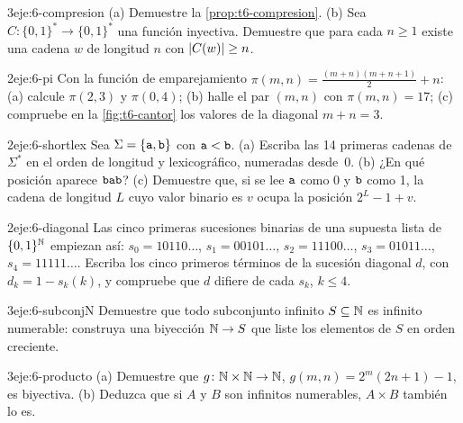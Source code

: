 \begin{ejercicio}{3}{eje:6-compresion}
(a) Demuestre la \cref{prop:t6-compresion}. (b) Sea $C\colon\{0,1\}^{*}\to\{0,1\}^{*}$ una función inyectiva. Demuestre que para cada $n\ge1$ existe una cadena $w$ de longitud $n$ con $\lvert C(w)\rvert\ge n$.
\end{ejercicio}

\begin{ejercicio}{2}{eje:6-pi}
Con la función de emparejamiento $\pi(m,n)=\tfrac{(m+n)(m+n+1)}{2}+n$: (a) calcule $\pi(2,3)$ y $\pi(0,4)$; (b) halle el par $(m,n)$ con $\pi(m,n)=17$; (c) compruebe en la \cref{fig:t6-cantor} los valores de la diagonal $m+n=3$.
\end{ejercicio}

\begin{ejercicio}{2}{eje:6-shortlex}
Sea $\Sigma=\{\texttt{a},\texttt{b}\}$ con $\texttt{a}<\texttt{b}$. (a) Escriba las 14 primeras cadenas de $\Sigma^{*}$ en el orden de longitud y lexicográfico, numeradas desde~0. (b) ¿En qué posición aparece $\texttt{bab}$? (c) Demuestre que, si se lee $\texttt{a}$ como 0 y $\texttt{b}$ como 1, la cadena de longitud $L$ cuyo valor binario es $v$ ocupa la posición $2^{L}-1+v$.
\end{ejercicio}

\begin{ejercicio}{2}{eje:6-diagonal}
Las cinco primeras sucesiones binarias de una supuesta lista de $\{0,1\}^{\mathbb{N}}$ empiezan así: $s_0=10110\ldots$, $s_1=00101\ldots$, $s_2=11100\ldots$, $s_3=01011\ldots$, $s_4=11111\ldots$. Escriba los cinco primeros términos de la sucesión diagonal $d$, con $d_k=1-s_k(k)$, y compruebe que $d$ difiere de cada $s_k$, $k\le4$.
\end{ejercicio}

\begin{ejercicio}{3}{eje:6-subconjN}
Demuestre que todo subconjunto infinito $S\subseteq\mathbb{N}$ es infinito numerable: construya una biyección $\mathbb{N}\to S$ que liste los elementos de $S$ en orden creciente.
\end{ejercicio}

\begin{ejercicio}{3}{eje:6-producto}
(a) Demuestre que $g\colon\mathbb{N}\times\mathbb{N}\to\mathbb{N}$, $g(m,n)=2^{m}(2n+1)-1$, es biyectiva. (b) Deduzca que si $A$ y $B$ son infinitos numerables, $A\times B$ también lo es.
\end{ejercicio}

